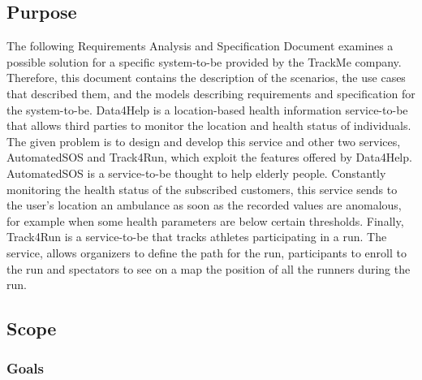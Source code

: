 \subsection{Purpose} 
The following Requirements Analysis and Specification Document examines a possible solution for a specific system-to-be provided by the TrackMe company. Therefore, this document contains the description of the scenarios, the use cases that described them, and the models describing requirements and specification for the system-to-be.
\bigbreak
\noindent
Data4Help is a location-based health information service-to-be that allows third parties to monitor the location and health status of individuals. The given problem is to design and develop this service and other two services, AutomatedSOS and Track4Run, which exploit the features offered by Data4Help.
\bigbreak
\noindent
AutomatedSOS is a service-to-be thought to help elderly people. Constantly monitoring the health status of the subscribed customers, this service sends to the user's location an ambulance as soon as the recorded values are anomalous, for example when some health parameters are below certain thresholds.
\bigbreak
\noindent
Finally, Track4Run is a service-to-be that tracks athletes participating in a run. The service, allows organizers to define the path for the run, participants to enroll to the run and spectators to see on a map the position of all the runners during the run.
\subsection{Scope}
\subsubsection{Goals}

